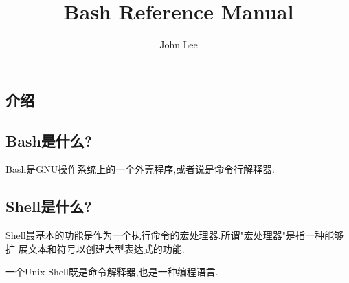 \documentclass[draft,openany]{book}
\begin{document}
\begin{CJK}{UTF8}{gbsn}

    \title{Bash Reference Manual}
    \author{John Lee}
    \renewcommand{\contentsname}{目\quad 录}
    \renewcommand{\chaptername}[2]{\Huge{第{\thechapter}章}}
    \renewcommand{\bibname}{参考文献}

    \setcounter{secnumdepth}{3}

    \setcounter{tocdepth}{3}

    \maketitle
    \tableofcontents

    \chapter{介绍}
    \section{Bash是什么?}
    Bash是GNU操作系统上的一个外壳程序,或者说是命令行解释器.

    \section{Shell是什么?}
    Shell最基本的功能是作为一个执行命令的宏处理器.所谓"宏处理器"是指一种能够扩
    展文本和符号以创建大型表达式的功能.\par
    一个Unix Shell既是命令解释器,也是一种编程语言.


\end{CJK}
\end{document}
